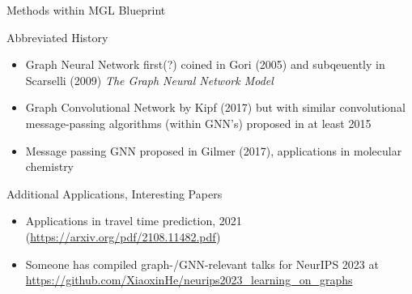 \documentclass{beamer}
\begin{document}
\begin{frame}{Methods within MGL Blueprint}

\end{frame}

\begin{frame}{Abbreviated History}
    \begin{itemize}
        \item Graph Neural Network first(?) coined in Gori (2005) \cite{gori_new_2005} and subqeuently in Scarselli (2009) {\it The Graph Neural Network Model} \cite{scarselli_graph_2009}
        \item Graph Convolutional Network by Kipf (2017) \cite{kipf_semi-supervised_2017} but with similar convolutional message-passing algorithms (within GNN's) proposed in at least 2015 \cite{duvenaud_convolutional_2015}
        \item Message passing GNN proposed in Gilmer (2017), applications in molecular chemistry \cite{gilmer_neural_2017} 
    \end{itemize}
\end{frame}

\begin{frame}[allowframebreaks]{Additional Applications, Interesting Papers}
    \begin{itemize}
        \item Applications in travel time prediction, 2021 (\url{https://arxiv.org/pdf/2108.11482.pdf})
        \item Someone has compiled graph-/GNN-relevant talks for NeurIPS 2023 at \url{https://github.com/XiaoxinHe/neurips2023_learning_on_graphs}
    \end{itemize}
\end{frame}

\end{document}
